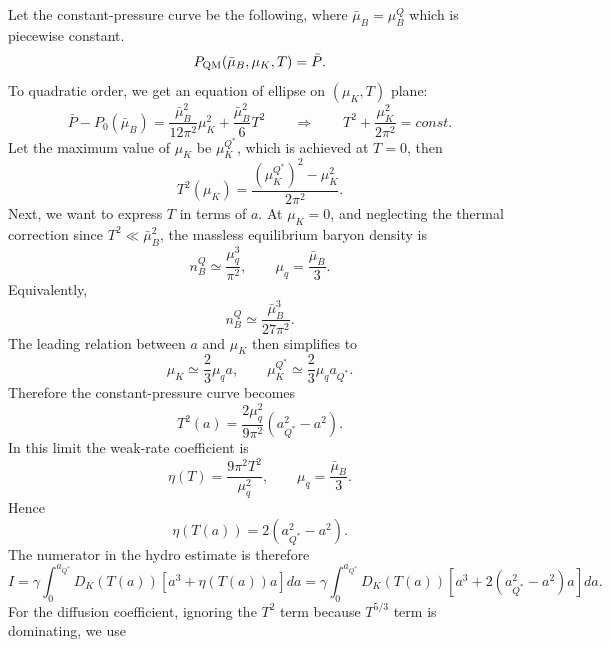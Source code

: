 \documentclass[11pt]{article}
\begin{document}
Let the constant-pressure curve be the following, where $\bar{\mu}_B = \mu_B^Q$ which is piecewise constant. 
\begin{equation}
P_{\rm QM}(\bar\mu_B,\mu_K,T)=\bar P .
\end{equation}
To quadratic order, we get an equation of ellipse on $(\mu_K, T)$ plane:
\begin{equation}
\bar P-P_0(\bar\mu_B)
=
\frac{\bar\mu_B^2}{12\pi^2}\mu_K^2
+
\frac{\bar\mu_B^2}{6}T^2\qquad\Rightarrow\qquad T^2 + \frac{\mu_K^2}{2\pi^2} = const.
\end{equation}
Let the maximum value of $\mu_K$ be $\mu_K^{Q^*}$, which is achieved at $T=0$, then
\begin{equation}
T^2(\mu_K)
=
\frac{(\mu_K^{Q^*})^2-\mu_K^2}{2\pi^2}.
\end{equation}
Next, we want to express $T$ in terms of $a$.
At \(\mu_K=0\), and neglecting the thermal correction since
\(T^2\ll \bar\mu_B^2\), the massless equilibrium baryon density is
\begin{equation}
n_B^Q\simeq\frac{\mu_q^3}{\pi^2},
\qquad
\mu_q=\frac{\bar\mu_B}{3}.
\end{equation}
Equivalently,
\begin{equation}
n_B^Q\simeq\frac{\bar\mu_B^3}{27\pi^2}.
\end{equation}
The leading relation between \(a\) and \(\mu_K\) then simplifies to
\begin{equation}
\mu_K\simeq \frac{2}{3}\mu_q a,
\qquad
\mu_K^{Q^*}\simeq \frac{2}{3}\mu_qa_{Q^*}.
\end{equation}
Therefore the constant-pressure curve becomes
\begin{equation}
T^2(a)
=
\frac{2\mu_q^2}{9\pi^2}
\left(a_{Q^*}^2-a^2\right).
\end{equation}
In this limit the weak-rate coefficient is
\begin{equation}
\eta(T)=\frac{9\pi^2T^2}{\mu_q^2},
\qquad
\mu_q=\frac{\bar\mu_B}{3}.
\end{equation}
Hence
\begin{equation}
\eta(T(a))
=
2\left(a_{Q^*}^2-a^2\right).
\end{equation}
The numerator in the hydro estimate is therefore
\begin{equation}
I
=
\gamma
\int_0^{a_{Q^*}}
D_K(T(a))
\left[a^3+\eta(T(a))a\right]da
=
\gamma
\int_0^{a_{Q^*}}
D_K(T(a))
\left[a^3+2(a_{Q^*}^2 - a^2)a\right]da.
\end{equation}
For the diffusion coefficient, ignoring the $T^2$ term because $T^{5/3}$ term is dominating, we use
\end{document}

